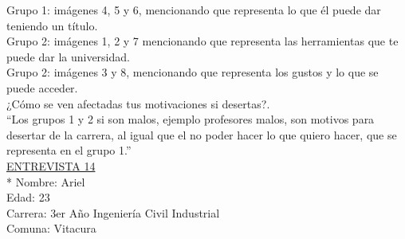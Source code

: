 Grupo 1: imágenes 4, 5 y 6, mencionando que representa lo que él puede dar teniendo un título.\\

Grupo 2: imágenes 1, 2 y 7 mencionando que representa las herramientas que te puede dar la universidad.\\

Grupo 2: imágenes 3 y 8, mencionando que representa los gustos y lo que se puede acceder.\\

¿Cómo se ven afectadas tus motivaciones si desertas?.\\

``Los grupos 1 y 2 si son malos, ejemplo profesores malos, son motivos para desertar de la carrera, al igual que el no poder hacer lo que quiero hacer, que se representa en el grupo 1.''\\

\underline {ENTREVISTA 14}\\*
Nombre: Ariel\\
Edad: 23\\
Carrera: 3er Año Ingeniería Civil Industrial\\
Comuna: Vitacura\\

